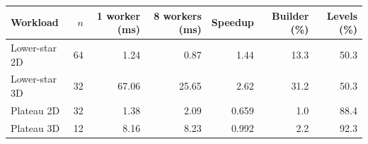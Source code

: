 \begin{tabular}{lrrrrrr}
\hline
Workload & $n$ & 1 worker (ms) & 8 workers (ms) & Speedup & Builder (\%) & Levels (\%) \\
\hline
Lower-star 2D & 64 & 1.24 & 0.87 & 1.44 & 13.3 & 50.3 \\
Lower-star 3D & 32 & 67.06 & 25.65 & 2.62 & 31.2 & 50.3 \\
Plateau 2D & 32 & 1.38 & 2.09 & 0.659 & 1.0 & 88.4 \\
Plateau 3D & 12 & 8.16 & 8.23 & 0.992 & 2.2 & 92.3 \\
\hline
\end{tabular}
